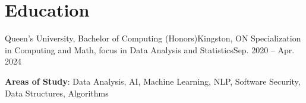 \section{Education}
  \resumeSubHeadingListStart
    \resumeSubheading
      {Queen's University, Bachelor of Computing (Honors)}{Kingston, ON}
      {Specialization in Computing and Math, focus in Data Analysis and Statistics}{Sep. 2020 -- Apr. 2024}
      \begin{itemize}[leftmargin=0.0in, label={}]
    \small{\item{
     \textbf{Areas of Study}{: Data Analysis, AI, Machine Learning, NLP, Software Security, Data Structures, Algorithms}
    }}
 \end{itemize}
  \resumeSubHeadingListEnd
